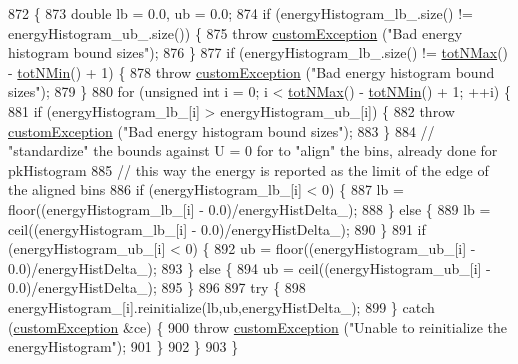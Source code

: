 \begin{DoxyCode}
872                                              \{
873     \textcolor{keywordtype}{double} lb = 0.0, ub = 0.0;
874     \textcolor{keywordflow}{if} (energyHistogram\_lb\_.size() != energyHistogram\_ub\_.size()) \{
875         \textcolor{keywordflow}{throw} \hyperlink{classcustom_exception}{customException} (\textcolor{stringliteral}{"Bad energy histogram bound sizes"});
876     \}
877     \textcolor{keywordflow}{if} (energyHistogram\_lb\_.size() != \hyperlink{classsim_system_aee2c65ecb43a35c0c4d070cdb45f7dc0}{totNMax}() - \hyperlink{classsim_system_af10842e0eaa638373b8717c87b47e6bc}{totNMin}() + 1) \{
878         \textcolor{keywordflow}{throw} \hyperlink{classcustom_exception}{customException} (\textcolor{stringliteral}{"Bad energy histogram bound sizes"});
879     \}
880     \textcolor{keywordflow}{for} (\textcolor{keywordtype}{unsigned} \textcolor{keywordtype}{int} i = 0; i < \hyperlink{classsim_system_aee2c65ecb43a35c0c4d070cdb45f7dc0}{totNMax}() - \hyperlink{classsim_system_af10842e0eaa638373b8717c87b47e6bc}{totNMin}() + 1; ++i) \{
881         \textcolor{keywordflow}{if} (energyHistogram\_lb\_[i] > energyHistogram\_ub\_[i]) \{
882             \textcolor{keywordflow}{throw} \hyperlink{classcustom_exception}{customException} (\textcolor{stringliteral}{"Bad energy histogram bound sizes"});
883         \}
884         \textcolor{comment}{// "standardize" the bounds against U = 0 for to "align" the bins, already done for pkHistogram}
885         \textcolor{comment}{// this way the energy is reported as the limit of the edge of the aligned bins}
886         \textcolor{keywordflow}{if} (energyHistogram\_lb\_[i] < 0) \{
887             lb = floor((energyHistogram\_lb\_[i] - 0.0)/energyHistDelta\_);
888         \} \textcolor{keywordflow}{else} \{
889             lb = ceil((energyHistogram\_lb\_[i] - 0.0)/energyHistDelta\_);
890         \}
891         \textcolor{keywordflow}{if} (energyHistogram\_ub\_[i] < 0) \{
892             ub = floor((energyHistogram\_ub\_[i] - 0.0)/energyHistDelta\_);
893         \} \textcolor{keywordflow}{else} \{
894             ub = ceil((energyHistogram\_ub\_[i] - 0.0)/energyHistDelta\_);
895         \}
896 
897         \textcolor{keywordflow}{try} \{
898             energyHistogram\_[i].reinitialize(lb,ub,energyHistDelta\_);
899         \} \textcolor{keywordflow}{catch} (\hyperlink{classcustom_exception}{customException} &ce) \{
900             \textcolor{keywordflow}{throw} \hyperlink{classcustom_exception}{customException} (\textcolor{stringliteral}{"Unable to reinitialize the energyHistogram"});
901         \}
902     \}
903 \}
\end{DoxyCode}
